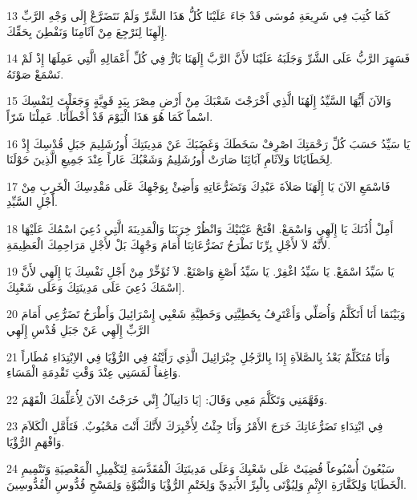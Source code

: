 \par 13 كَمَا كُتِبَ فِي شَرِيعَةِ مُوسَى قَدْ جَاءَ عَلَيْنَا كُلُّ هَذَا الشَّرِّ وَلَمْ نَتَضَرَّعْ إِلَى وَجْهِ الرَّبِّ إِلَهِنَا لِنَرْجِعَ مِنْ آثَامِنَا وَنَفْطِنَ بِحَقِّكَ.
\par 14 فَسَهِرَ الرَّبُّ عَلَى الشَّرِّ وَجَلَبَهُ عَلَيْنَا لأَنَّ الرَّبَّ إِلَهَنَا بَارٌّ فِي كُلِّ أَعْمَالِهِ الَّتِي عَمِلَهَا إِذْ لَمْ نَسْمَعْ صَوْتَهُ.
\par 15 وَالآنَ أَيُّهَا السَّيِّدُ إِلَهُنَا الَّذِي أَخْرَجْتَ شَعْبَكَ مِنْ أَرْضِ مِصْرَ بِيَدٍ قَوِيَّةٍ وَجَعَلْتَ لِنَفْسِكَ اسْماً كَمَا هُوَ هَذَا الْيَوْمَ قَدْ أَخْطَأْنَا. عَمِلْنَا شَرّاً.
\par 16 يَا سَيِّدُ حَسَبَ كُلِّ رَحْمَتِكَ اصْرِفْ سَخَطَكَ وَغَضَبَكَ عَنْ مَدِينَتِكَ أُورُشَلِيمَ جَبَلِ قُدْسِكَ إِذْ لِخَطَايَانَا وَلِآثَامِ آبَائِنَا صَارَتْ أُورُشَلِيمُ وَشَعْبُكَ عَاراً عِنْدَ جَمِيعِ الَّذِينَ حَوْلَنَا.
\par 17 فَاسْمَعِ الآنَ يَا إِلَهَنَا صَلاَةَ عَبْدِكَ وَتَضَرُّعَاتِهِ وَأَضِئْ بِوَجْهِكَ عَلَى مَقْدِسِكَ الْخَرِبِ مِنْ أَجْلِ السَّيِّدِ.
\par 18 أَمِلْ أُذُنَكَ يَا إِلَهِي وَاسْمَعْ. افْتَحْ عَيْنَيْكَ وَانْظُرْ خِرَبَنَا وَالْمَدِينَةَ الَّتِي دُعِيَ اسْمُكَ عَلَيْهَا لأَنَّهُ لاَ لأَجْلِ بِرِّنَا نَطْرَحُ تَضَرُّعَاتِنَا أَمَامَ وَجْهِكَ بَلْ لأَجْلِ مَرَاحِمِكَ الْعَظِيمَةِ.
\par 19 يَا سَيِّدُ اسْمَعْ. يَا سَيِّدُ اغْفِرْ. يَا سَيِّدُ أَصْغِ وَاصْنَعْ. لاَ تُؤَخِّرْ مِنْ أَجْلِ نَفْسِكَ يَا إِلَهِي لأَنَّ اسْمَكَ دُعِيَ عَلَى مَدِينَتِكَ وَعَلَى شَعْبِكَ].
\par 20 وَبَيْنَمَا أَنَا أَتَكَلَّمُ وَأُصَلِّي وَأَعْتَرِفُ بِخَطِيَّتِي وَخَطِيَّةِ شَعْبِي إِسْرَائِيلَ وَأَطْرَحُ تَضَرُّعِي أَمَامَ الرَّبِّ إِلَهِي عَنْ جَبَلِ قُدْسِ إِلَهِي
\par 21 وَأَنَا مُتَكَلِّمٌ بَعْدُ بِالصَّلاَةِ إِذَا بِالرَّجُلِ جِبْرَائِيلَ الَّذِي رَأَيْتُهُ فِي الرُّؤْيَا فِي الاِبْتِدَاءِ مُطَاراً وَاغِفاً لَمَسَنِي عِنْدَ وَقْتِ تَقْدِمَةِ الْمَسَاءِ.
\par 22 وَفَهَّمَنِي وَتَكَلَّمَ مَعِي وَقَالَ: [يَا دَانِيآلُ إِنِّي خَرَجْتُ الآنَ لِأُعَلِّمَكَ الْفَهْمَ.
\par 23 فِي ابْتِدَاءِ تَضَرُّعَاتِكَ خَرَجَ الأَمْرُ وَأَنَا جِئْتُ لِأُخْبِرَكَ لأَنَّكَ أَنْتَ مَحْبُوبٌ. فَتَأَمَّلِ الْكَلاَمَ وَافْهَمِ الرُّؤْيَا.
\par 24 سَبْعُونَ أُسْبُوعاً قُضِيَتْ عَلَى شَعْبِكَ وَعَلَى مَدِينَتِكَ الْمُقَدَّسَةِ لِتَكْمِيلِ الْمَعْصِيَةِ وَتَتْمِيمِ الْخَطَايَا وَلِكَفَّارَةِ الإِثْمِ وَلِيُؤْتَى بِالْبِرِّ الأَبَدِيِّ وَلِخَتْمِ الرُّؤْيَا وَالنُّبُوَّةِ وَلِمَسْحِ قُدُّوسِ الْقُدُّوسِينَ.
